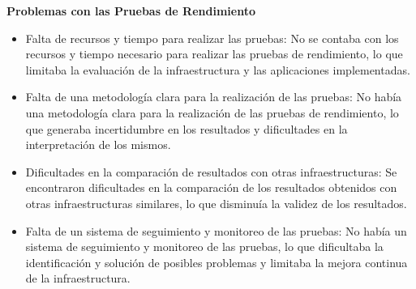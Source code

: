 \begin{spacing}{1.5}
    \textbf{Problemas con las Pruebas de Rendimiento}

    \begin{itemize}
        \item Falta de recursos y tiempo para realizar las pruebas: No se contaba con los recursos y tiempo necesario para realizar las pruebas de rendimiento, lo que limitaba la evaluación de la infraestructura y las aplicaciones implementadas.
        \item Falta de una metodología clara para la realización de las pruebas: No había una metodología clara para la realización de las pruebas de rendimiento, lo que generaba incertidumbre en los resultados y dificultades en la interpretación de los mismos.
        \item Dificultades en la comparación de resultados con otras infraestructuras: Se encontraron dificultades en la comparación de los resultados obtenidos con otras infraestructuras similares, lo que disminuía la validez de los resultados.
        \item Falta de un sistema de seguimiento y monitoreo de las pruebas: No había un sistema de seguimiento y monitoreo de las pruebas, lo que dificultaba la identificación y solución de posibles problemas y limitaba la mejora continua de la infraestructura.
    \end{itemize}

    
\mylinespacing
\mylinespacing
\begin{tightcenter}
\end{tightcenter}
\end{spacing}
